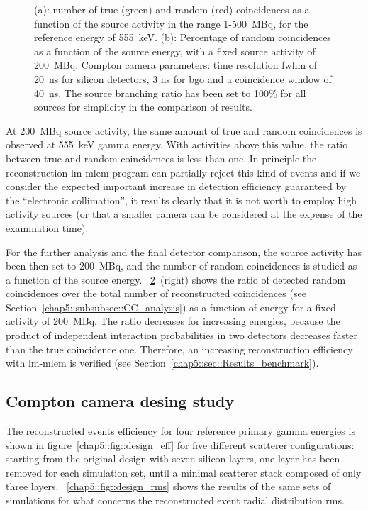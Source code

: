 \begin{figure}
\begin{subfigure}[t]{.5\textwidth}
  \label{chap5::fig::timing_energy}
\end{subfigure}
\caption{(a): number of true (green) and random (red) coincidences as a function of the source activity in the range 1-500~MBq, for the reference energy of 555~keV. (b): Percentage of random coincidences as a function of the source energy, with a fixed source activity of 200~MBq. Compton camera parameters: time resolution \gls{fwhm} of 20~ns for silicon detectors, 3 ns for \gls{bgo} and a coincidence window of 40~ns. The source branching ratio has been set to 100\% for all sources for simplicity in the comparison of results.}
\label{chap5::fig::timig_en_coinc}
\end{figure} 

At 200~MBq source activity, the same amount of true and random coincidences is observed at 555~keV gamma energy. With activities above this value, the ratio between true and random coincidences is less than one. In principle the reconstruction \gls{lm-mlem} program can partially reject this kind of events and if we consider the expected important increase in detection efficiency guaranteed by the \enquote{electronic collimation}, it results clearly that it is not worth to employ high activity sources (or that a smaller camera can be considered at the expense of the examination time).

For the further analysis and the final detector comparison, the source activity has been then set to 200~MBq, and the number of random coincidences is studied as a function of the source energy. \figurename~\ref{chap5::fig::timig_en_coinc}~(right) shows the ratio of detected random coincidences over the total number of reconstructed coincidences (see Section~\ref{chap5::subsubsec::CC_analysis}) as a function of energy for a fixed activity of 200~MBq. The ratio decreases for increasing energies, because the product of independent interaction probabilities in two detectors decreases faster than the true coincidence one. Therefore, an increasing reconstruction efficiency with \gls{lm-mlem} is verified (see Section~\ref{chap5::sec::Results_benchmark}).

\subsection{Compton camera desing study}\label{chap5::subsec::Results_CC_SPECT_design}
The reconstructed events efficiency for four reference primary gamma energies is shown in figure~\ref{chap5::fig::design_eff} for five different scatterer configurations: starting from the original design with seven silicon layers, one layer has been removed for each simulation set, until a minimal scatterer stack composed of only three layers. \figurename~\ref{chap5::fig::design_rms} shows the results of the same sets of simulations for what concerns the reconstructed event radial distribution \gls{rms}.  

